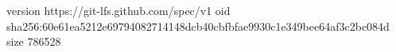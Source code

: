 version https://git-lfs.github.com/spec/v1
oid sha256:60e61ea5212e69794082714148dcb40cbfbfae9930c1e349bee64af3c2bc084d
size 786528
